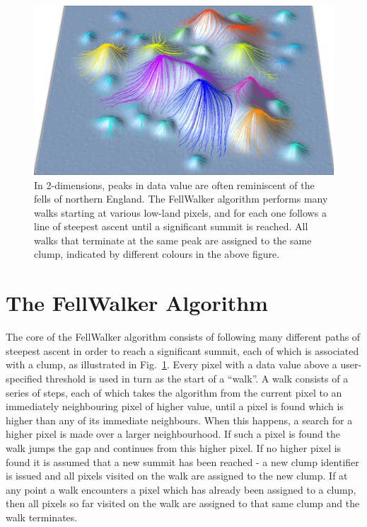 \documentclass[final,authoryear,5p,times,twocolumn]{elsarticle}
\begin{document}
\begin{figure}
\includegraphics[width=\columnwidth]{fellwalking}
\caption{In 2-dimensions, peaks in data value are often reminiscent of the
fells of northern England. The FellWalker algorithm performs many walks
starting at various low-land pixels, and for each one follows a line of steepest ascent
until a significant summit is reached. All walks that terminate at the
same peak are assigned to the same clump, indicated by different colours
in the above figure.}
\label{fig:fellwalking}
\end{figure}

\section{The FellWalker Algorithm}

The core of the FellWalker algorithm consists of following many different
paths of steepest ascent in order to reach a significant summit, each of
which is associated with a clump, as illustrated in Fig.~\ref{fig:fellwalking}.
Every pixel with a data value above a user-specified threshold is used in
turn as the start of a ``walk''. A walk consists of a series of steps,
each of which takes the algorithm from the current pixel to an immediately
neighbouring pixel of higher value, until a pixel is found which is
higher than any of its immediate neighbours. When this happens, a search
for a higher pixel is made over a larger neighbourhood. If such a pixel
is found the walk jumps the gap and continues from this higher pixel. If no
higher pixel is found it is assumed that a new summit has been reached -
a new clump identifier is issued and all pixels visited on the walk are
assigned to the new clump. If at any point a walk encounters a pixel
which has already been assigned to a clump, then all pixels so far
visited on the walk are assigned to that same clump and the walk
terminates.
\end{document}
